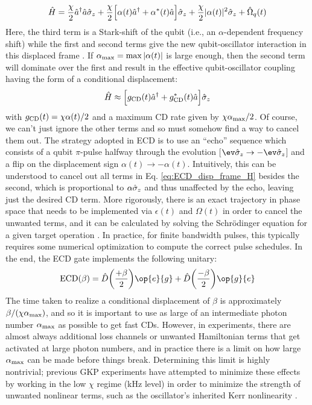\begin{equation}
    \hat{H} = \frac{\chi}{2}\hat{a}^\dagger\hat{a}\hat{\sigma}_z + \frac{\chi}{2}\Big[\alpha(t)\hat{a}^\dagger + \alpha^\ast(t)\hat{a}\Big]\hat{\sigma}_z + \frac{\chi}{2}|\alpha(t)|^2\hat{\sigma}_z +  \hat{\Omega}_q(t)
    \label{eq:ECD_disp_frame_H}
\end{equation}
Here, the third term is a Stark-shift of the qubit (i.e., an $\alpha$-dependent frequency shift) while the first and second terms give the new qubit-oscillator interaction in this displaced frame \cite{murch2012cavity, eddins2018stroboscopic}. If $\alpha_{\rm max} = \max|\alpha(t)|$ is large enough, then the second term will dominate over the first and result in the effective qubit-oscillator coupling having the form of a conditional displacement: 
\begin{equation}
    \hat{H} \approx \Big[g_{\rm CD}(t)\hat{a}^\dagger + g_{\rm CD}^\ast(t)\hat{a}\Big]\hat{\sigma}_z
\end{equation}
with $g_{\rm CD}(t) = \chi\alpha(t)/2$ and a maximum CD rate given by $\chi\alpha_{\rm max}/2$. Of course, we can't just ignore the other terms and so must somehow find a way to cancel them out. The strategy adopted in ECD is to use an ``echo'' sequence which consists of a qubit $\pi$-pulse halfway through the evolution [$\ev\sigmaz \to -\ev\sigmaz$] and a flip on the displacement sign $\alpha(t) \to -\alpha(t)$. Intuitively, this can be understood to cancel out all terms in Eq. \eqref{eq:ECD_disp_frame_H} besides the second, which is proportional to $\alpha\hat{\sigma}_z$ and thus unaffected by the echo, leaving just the desired CD term. More rigorously, there is an exact trajectory in phase space that needs to be implemented via $\epsilon(t)$ and $\Omega(t)$ in order to cancel the unwanted terms, and it can be calculated by solving the Schr\"odinger equation for a given target operation \cite{eickbusch2022fast}. In practice, for finite bandwidth pulses, this typically requires some numerical optimization to compute the correct pulse schedules. In the end, the ECD gate implements the following unitary:
\begin{equation}
    {\rm ECD}(\beta) = \hat{D}\bigg(\frac{+\beta}{2}\bigg)\op{e}{g} + \hat{D}\bigg(\frac{-\beta}{2}\bigg)\op{g}{e}
\end{equation}
The time taken to realize a conditional displacement of $\beta$ is approximately $\beta / (\chi\alpha_{\rm max})$, and so it is important to use as large of an intermediate photon number $\alpha_{\rm max}$ as possible to get fast CDs. However, in experiments, there are almost always additional loss channels or unwanted Hamiltonian terms that get activated at large photon numbers, and in practice there is a limit on how large $\alpha_{\rm max}$ can be made before things break. Determining this limit is highly nontrivial; previous GKP experiments have attempted to minimize these effects by working in the low $\chi$ regime (kHz level) in order to minimize the strength of unwanted nonlinear terms, such as the oscillator's inherited Kerr nonlinearity \cite{campagne2020gkp-expt, eickbusch2022fast, sivak2023gkp-expt, nordquantique2023gkp-expt}. 


